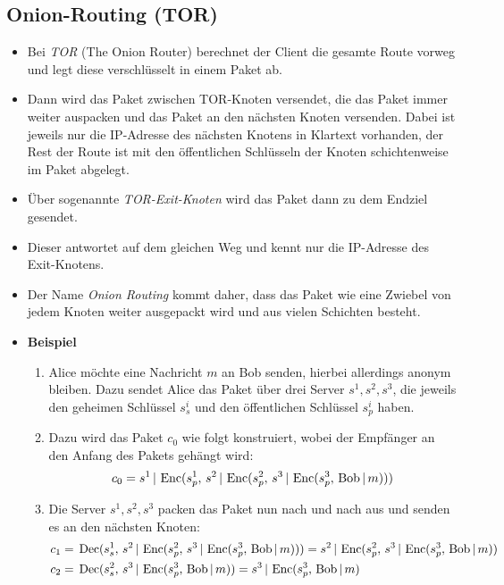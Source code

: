 		\subsection{Onion-Routing (TOR)}
			\begin{itemize}
				\item Bei \textit{TOR} (The Onion Router) berechnet der Client die gesamte Route vorweg und legt diese verschlüsselt in einem Paket ab.
				\item Dann wird das Paket zwischen TOR-Knoten versendet, die das Paket immer weiter auspacken und das Paket an den nächsten Knoten versenden. Dabei ist jeweils nur die IP-Adresse des nächsten Knotens in Klartext vorhanden, der Rest der Route ist mit den öffentlichen Schlüsseln der Knoten schichtenweise im Paket abgelegt.
				\item Über sogenannte \textit{TOR-Exit-Knoten} wird das Paket dann zu dem Endziel gesendet.
				\item Dieser antwortet auf dem gleichen Weg und kennt nur die IP-Adresse des Exit-Knotens.
				\item Der Name \textit{Onion Routing} kommt daher, dass das Paket wie eine Zwiebel von jedem Knoten weiter ausgepackt wird und aus vielen Schichten besteht.
				\item \textbf{Beispiel}
					\begin{enumerate}
						\item Alice möchte eine Nachricht \(m\) an Bob senden, hierbei allerdings anonym bleiben. Dazu sendet Alice das Paket über drei Server \( s^1, s^2, s^3 \), die jeweils den geheimen Schlüssel \( s^i_s \) und den öffentlichen Schlüssel \( s^i_p \) haben.
						\item Dazu wird das Paket \( c_0 \) wie folgt konstruiert, wobei der Empfänger an den Anfang des Pakets gehängt wird:
							\begin{equation*}
								c_0 = s^1 \,\vert\, \operatorname{Enc}(s^1_p,\, s^2 \,\vert\, \operatorname{Enc}(s^2_p,\, s^3 \,\vert\, \operatorname{Enc}(s^3_p,\, \text{Bob} \,\vert\, m)))
							\end{equation*}
						\item Die Server \( s^1, s^2, s^3 \) packen das Paket nun nach und nach aus und senden es an den nächsten Knoten:
							\begin{align*}
								c_1 & =\, \Dec(s^1_s,\, s^2 \,\vert\, \Enc(s^2_p,\, s^3 \,\vert\, \Enc(s^3_p,\, \text{Bob} \,\vert\, m))) = s^2 \,\vert\, \Enc(s^2_p,\, s^3 \,\vert\, \Enc(s^3_p,\, \text{Bob} \,\vert\, m)) \\
								c_2 & =\, \Dec(s^2_s,\, s^3 \,\vert\, \Enc(s^3_p,\, \text{Bob} \,\vert\, m)) = s^3 \,\vert\, \Enc(s^3_p,\, \text{Bob} \,\vert\, m)                                                           \\

\end{align*}
\end{enumerate}
\end{itemize}
